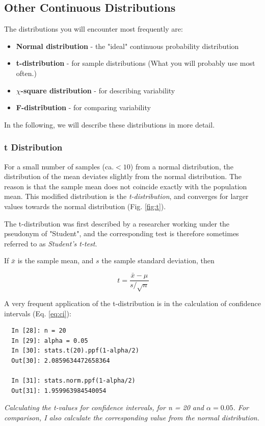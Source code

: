 \subsection{Other Continuous Distributions}\label{sec:ContinuousDistributions} 

The distributions you will encounter most frequently are:

\begin{itemize}
  \item \textbf{Normal distribution} - the "ideal" continuous probability distribution
  \item \textbf{t-distribution} - for sample distributions (What you will probably use most often.)
  \item \textbf{$\chi$-square distribution} - for describing  variability
  \item \textbf{F-distribution} - for comparing variability
\end{itemize}

In the following, we will describe these distributions in more detail.

\subsubsection{t Distribution}
For a small number of samples (ca.$<10$) from a normal distribution, the distribution of the mean deviates slightly from the normal distribution. The reason is that the sample mean does not coincide exactly with the population mean. This modified distribution is the \emph{t-distribution}, and converges for larger values towards the normal distribution (Fig. \ref{fig:t}).

The t-distribution was first described by a researcher working under the pseudonym of "Student", and the corresponding test is therefore sometimes referred to as \emph{Student's t-test}.

If $\bar{x}$ is the sample mean, and $s$ the sample standard deviation, then

\begin{equation}\
  t = \frac{\bar{x}-\mu}{s/ \sqrt{n}}
\end{equation}

A very frequent application of the t-distribution is in the calculation of confidence intervals (Eq. \ref{eq:ci}):

\begin{lstlisting}
  In [28]: n = 20
  In [29]: alpha = 0.05
  In [30]: stats.t(20).ppf(1-alpha/2)
  Out[30]: 2.0859634472658364

  In [31]: stats.norm.ppf(1-alpha/2)
  Out[31]: 1.959963984540054
\end{lstlisting}
\emph{Calculating the t-values for confidence intervals, for n = 20 and $\alpha=0.05$. For comparison, I also calculate the corresponding value from the normal distribution.}

